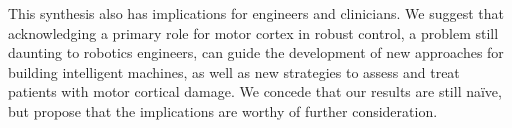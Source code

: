 This synthesis also has implications for engineers and clinicians. We suggest that acknowledging a primary role for motor cortex in robust control, a problem still daunting to robotics engineers, can guide the development of new approaches for building intelligent machines, as well as new strategies to assess and treat patients with motor cortical damage. We concede that our results are still naïve, but propose that the implications are worthy of further consideration.


